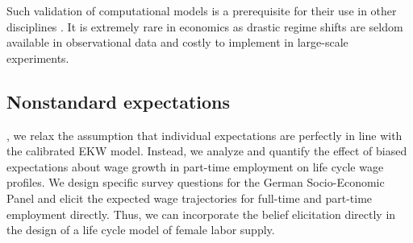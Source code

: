 \noindent Such validation of computational models is a prerequisite for their use in other disciplines \citep{Adams.2012,Oberkampf.2010}. It is extremely rare in economics as drastic regime shifts are seldom available in observational data and costly to implement in large-scale experiments.
\subsection{Nonstandard expectations}
\citet{Eisenhauer.2020a}, we relax the assumption that individual expectations are perfectly in line with the calibrated EKW model. Instead, we analyze and quantify the effect of biased expectations about wage growth in part-time employment on life cycle wage profiles. We design specific survey questions for the German Socio-Economic Panel \citep{DIW.2005} and elicit the expected wage trajectories for full-time and part-time employment directly. Thus, we can incorporate the belief elicitation directly in the design of a life cycle model of female labor supply.
